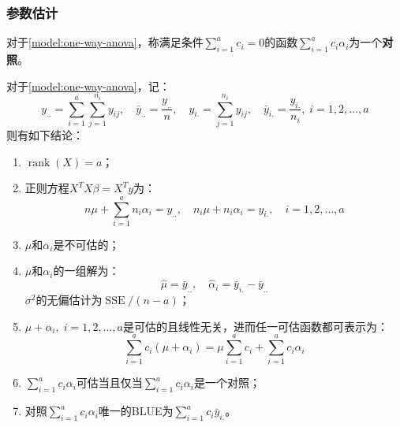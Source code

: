 \subsubsection{参数估计}
\begin{definition}
	对于\cref{model:one-way-anova}，称满足条件$\sum\limits_{i=1}^{a}c_i=0$的函数$\sum\limits_{i=1}^{a}c_i\alpha_i$为一个\textbf{对照}。
\end{definition}
\begin{theorem}\label{theo:one-way-anova-estimate}
	对于\cref{model:one-way-anova}，记：
	\begin{equation*}
		y_{..}=\sum_{i=1}^a\sum_{j=1}^{n_i}y_{ij},\quad\bar{y}_{..}=\frac{y_{..}}{n},\quad y_{i.}=\sum_{j=1}^{n_i}y_{ij},\quad \bar{y}_{i.}=\frac{y_{i.}}{n_i},\;i=1,2,\dots,a
	\end{equation*}
	则有如下结论：
	\begin{enumerate}
		\item $\operatorname{rank}(X)=a$；
		\item 正则方程$X^TX\beta=X^Ty$为：
		\begin{equation*}
			n\mu+\sum_{i=1}^{a}n_i\alpha_i=y_{..},\quad n_i\mu+n_i\alpha_i=y_{i.},\quad i=1,2,\dots,a
		\end{equation*}
		\item $\mu$和$\alpha_i$是不可估的；
		\item $\mu$和$\alpha_i$的一组解为：
		\begin{equation*}
			\hat{\mu}=\bar{y}_{..},\quad\hat{\alpha}_i=\bar{y}_{i.}-\bar{y}_{..}
		\end{equation*}
		$\sigma^2$的无偏估计为$\operatorname{SSE}/(n-a)$；
		\item $\mu+\alpha_i,\;i=1,2,\dots,a$是可估的且线性无关，进而任一可估函数都可表示为：
		\begin{equation*}
			\sum_{i=1}^{a}c_i(\mu+\alpha_i)=\mu\sum_{i=1}^{a}c_i+\sum_{i=1}^{a}c_i\alpha_i
		\end{equation*}
		\item $\sum\limits_{i=1}^{a}c_i\alpha_i$可估当且仅当$\sum\limits_{i=1}^{a}c_i\alpha_i$是一个对照；
		\item 对照$\sum\limits_{i=1}^{a}c_i\alpha_i$唯一的BLUE为$\sum\limits_{i=1}^{a}c_i\bar{y}_{i.}$。
	\end{enumerate}
\end{theorem}
